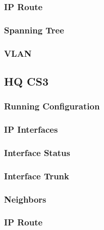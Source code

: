 \subsubsection{IP Route}


\subsubsection{Spanning Tree}


\subsubsection{VLAN}






\subsection{HQ CS3}
\subsubsection{Running Configuration}


\subsubsection{IP Interfaces}


\subsubsection{Interface Status}


\subsubsection{Interface Trunk}


\subsubsection{Neighbors}


\subsubsection{IP Route}


